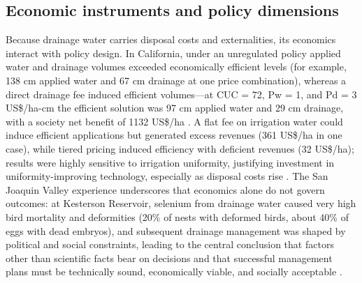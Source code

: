 \documentclass[11pt]{article}
\begin{document}
\subsection{Economic instruments and policy dimensions}
Because drainage water carries disposal costs and externalities, its economics interact with policy design. In California, under an unregulated policy applied water and drainage volumes exceeded economically efficient levels (for example, 138 cm applied water and 67 cm drainage at one price combination), whereas a direct drainage fee induced efficient volumes---at CUC = 72, Pw = 1, and Pd = 3 US\$/ha-cm the efficient solution was 97 cm applied water and 29 cm drainage, with a society net benefit of 1132 US\$/ha \parencite{DINAR1989}. A flat fee on irrigation water could induce efficient applications but generated excess revenues (361 US\$/ha in one case), while tiered pricing induced efficiency with deficient revenues (32 US\$/ha); results were highly sensitive to irrigation uniformity, justifying investment in uniformity-improving technology, especially as disposal costs rise \parencite{DINAR1989}. The San Joaquin Valley experience underscores that economics alone do not govern outcomes: at Kesterson Reservoir, selenium from drainage water caused very high bird mortality and deformities (20\% of nests with deformed birds, about 40\% of eggs with dead embryos), and subsequent drainage management was shaped by political and social constraints, leading to the central conclusion that factors other than scientific facts bear on decisions and that successful management plans must be technically sound, economically viable, and socially acceptable \parencite{Letey1999}.
\end{document}
